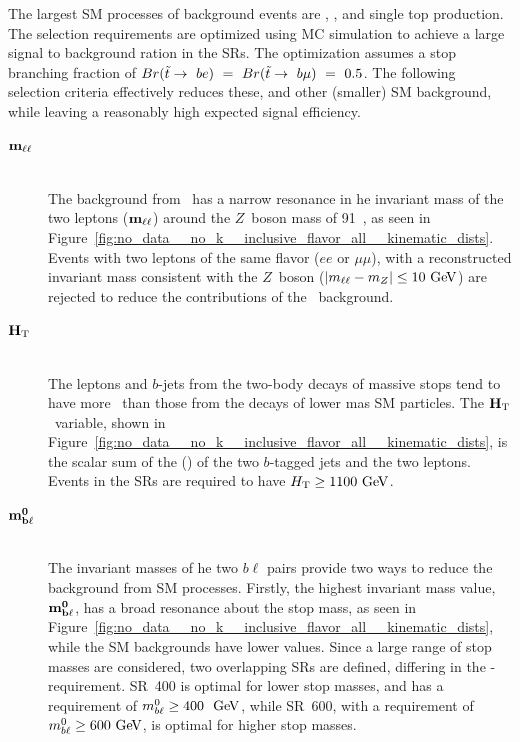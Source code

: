 The largest SM processes of background events are \ZGAMMAJETS, \TTBAR, and
single top production.
The selection requirements are optimized using MC simulation to achieve a
large signal to background ration in the SRs.
The optimization assumes a stop branching fraction of
$Br(\tilde{t}\rightarrow~be)~=~Br(\tilde{t}\rightarrow~b\mu)~=~0.5$.
The following selection criteria effectively reduces these, and other
(smaller) SM background, while leaving a reasonably high expected signal
efficiency.

\begin{description}
  \item[$\mathbf{m_{\ell\ell}}$] \hfill \\
    The background from \ZGAMMAJETS\ has a narrow resonance in he invariant
    mass of the two leptons ($\mathbf{m_{\ell\ell}}$) around the $Z$~boson mass of
    91~\GeV, as seen in
    Figure~\ref{fig:no_data__no_k__inclusive_flavor_all__kinematic_dists}.
    Events with two leptons of the same flavor ($ee$ or $\mu\mu$), with a
    reconstructed invariant mass consistent with the $Z$~boson
    ($|m_{\ell\ell} - m_{Z}| \leq 10 \GeV$) are rejected to reduce the
    contributions of the \ZGAMMAJETS\ background.
  \item[$\mathbf{H_{\mathrm{T}}}$] \hfill \\
    The leptons and $b$-jets from the two-body decays of massive stops tend to
    have more \pt\ than those from the decays of lower mas SM particles.
    The $\mathbf{H_{\mathrm{T}}}$\ variable, shown in
    Figure~\ref{fig:no_data__no_k__inclusive_flavor_all__kinematic_dists},
    is the scalar sum of the \et(\pt) of the two $b$-tagged jets and the two
    leptons.
    Events in the SRs are required to have $\HT \geq 1100 \GeV$.
  \item[$\mathbf{m_{b\ell}^{0}}$] \hfill \\
    The invariant masses of he two $b\ell$ pairs provide two ways to reduce
    the background from SM processes.
    Firstly, the highest invariant mass value, $\mathbf{m_{b\ell}^{0}}$, has a broad
    resonance about the stop mass, as seen in
    Figure~\ref{fig:no_data__no_k__inclusive_flavor_all__kinematic_dists},
    while the SM backgrounds have lower values.
    Since a large range of stop masses are considered, two overlapping SRs are
    defined, differing in the \MBL-requirement.
    SR~400 is optimal for lower stop masses, and has a requirement of
    $\MBL^0 \geq 400~\GeV$, while SR~600, with a requirement of
    $\MBL^0 \geq 600 \GeV$, is optimal for higher stop masses.
    \\[1ex]

\end{description}
